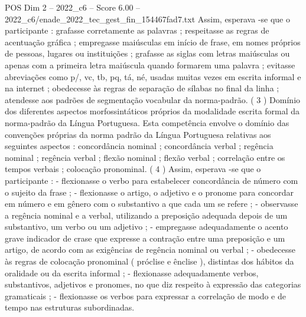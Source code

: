 \begin{textsample}{POS Dim 2 – 2022\_c6 – Score 6.00 – 2022\_c6/enade\_2022\_tec\_gest\_fin\_154467fad7.txt}
Assim, esperava -se que o participante : grafasse corretamente as palavras ; respeitasse as regras de acentuação gráfica ; empregasse maiúsculas em início de frase, em nomes próprios de pessoas, lugares ou instituições ; grafasse as siglas com letras maiúsculas ou apenas com a primeira letra maiúscula quando formarem uma palavra ; evitasse abreviações como p/, vc, tb, pq, tá, né, usadas muitas vezes em escrita informal e na internet ; obedecesse às regras de separação de sílabas no final da linha ; atendesse aos padrões de segmentação vocabular da norma-padrão. ( 3 ) Domínio dos diferentes aspectos morfossintáticos próprios da modalidade escrita formal da norma-padrão da Língua Portuguesa.
Esta competência envolve o domínio das convenções próprias da norma padrão da Língua Portuguesa relativas aos seguintes aspectos : concordância nominal ; concordância verbal ; regência nominal ; regência verbal ; flexão nominal ; flexão verbal ; correlação entre os tempos verbais ; colocação pronominal. ( 4 ) Assim, esperava -se que o participante : - flexionasse o verbo para estabelecer concordância de número com o sujeito da frase ; - flexionasse o artigo, o adjetivo e o pronome para concordar em número e em gênero com o substantivo a que cada um se refere ; - observasse a regência nominal e a verbal, utilizando a preposição adequada depois de um substantivo, um verbo ou um adjetivo ; - empregasse adequadamente o acento grave indicador de crase que expresse a contração entre uma preposição e um artigo, de acordo com as exigências de regência nominal ou verbal ; - obedecesse às regras de colocação pronominal ( próclise e ênclise ), distintas dos hábitos da oralidade ou da escrita informal ; - flexionasse adequadamente verbos, substantivos, adjetivos e pronomes, no que diz respeito à expressão das categorias gramaticais ; - flexionasse os verbos para expressar a correlação de modo e de tempo nas estruturas subordinadas.

\end{textsample}

